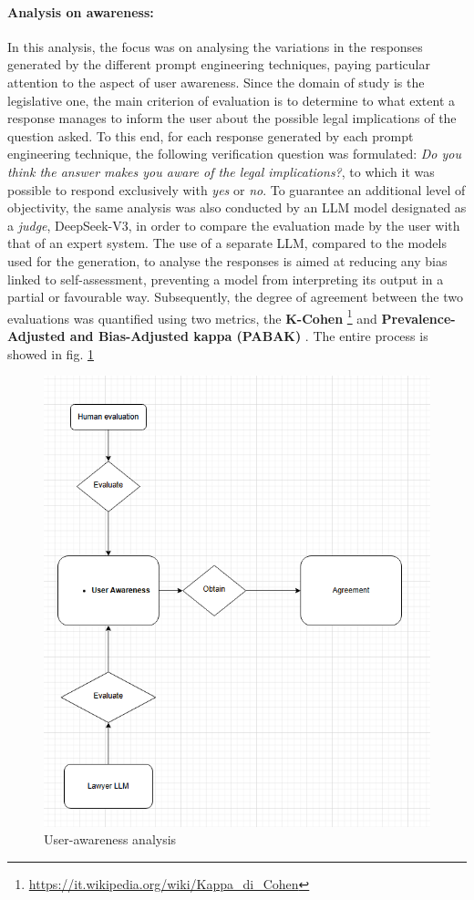 \paragraph{Analysis on awareness:} 
In this analysis, the focus was on analysing the variations in the responses generated by the different prompt engineering techniques, paying particular attention to the aspect of user awareness. Since the domain of study is the legislative one, the main criterion of evaluation is to determine to what extent a response manages to inform the user about the possible legal implications of the question asked. To this end, for each response generated by each prompt engineering technique, the following verification question was formulated: \textit{Do you think the answer makes you aware of the legal implications?}, to which it was possible to respond exclusively with \textit{yes} or \textit{no}. To guarantee an additional level of objectivity, the same analysis was also conducted by an LLM model designated as a \textit{judge}, DeepSeek-V3, in order to compare the evaluation made by the user with that of an expert system.
The use of a separate LLM, compared to the models used for the generation, to analyse the responses is aimed at reducing any bias linked to self-assessment, preventing a model from interpreting its output in a partial or favourable way.
Subsequently, the degree of agreement between the two evaluations was quantified using two metrics, the \textbf{K-Cohen} \footnote{\url{https://it.wikipedia.org/wiki/Kappa_di_Cohen}} and \textbf{Prevalence-Adjusted and Bias-Adjusted kappa (PABAK)} \cite{Pabak}. The entire process is showed in fig. \ref{fig:Agreem}
\begin{figure}[H]
    \centering
    \includegraphics[width=0.7\linewidth]{Figures/Agreement.png}
    \caption{User-awareness analysis}
    \label{fig:Agreem}
\end{figure}
